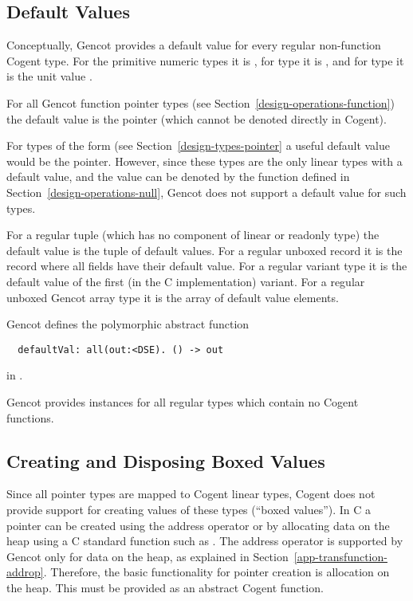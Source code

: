 \subsection{Default Values}
\label{design-operations-default}

Conceptually, Gencot provides a default value for every regular non-function Cogent type. For the primitive numeric types it is 
, for type  it is , and for type \code{()} it is the unit value \code{()}.

For all Gencot function pointer types (see Section~\ref{design-operations-function}) the default value is the 
pointer (which cannot be denoted directly in Cogent).

For types of the form  (see Section~\ref{design-types-pointer} a useful default value would be the 
 pointer. However, since these types are the only linear types with a default value, and the  value
can be denoted by the function  defined in Section~\ref{design-operations-null}, Gencot does not support
a default value for such types.

For a regular tuple (which has no component of linear or readonly type) the default value is the tuple of default values. For a
regular unboxed record it is the record where all fields have their default value. For a regular variant type it is
the default value of the first (in the C implementation) variant. For a regular unboxed Gencot array type it is the 
array of default value elements.

Gencot defines the polymorphic abstract function
\begin{verbatim}
  defaultVal: all(out:<DSE). () -> out
\end{verbatim}
in . 

Gencot provides instances for all regular types which contain no Cogent functions.

\subsection{Creating and Disposing Boxed Values}
\label{design-operations-create}

Since all pointer types are mapped to Cogent linear types, Cogent does not provide support for creating values
of these types (``boxed values''). In C a pointer can be created using the address operator \code{\&} or by allocating data on
the heap using a C standard function such as . The address operator is supported by Gencot
only for data on the heap, as explained in Section~\ref{app-transfunction-addrop}. Therefore, the basic functionality
for pointer creation is allocation on the heap. This must be provided as an abstract Cogent function.

